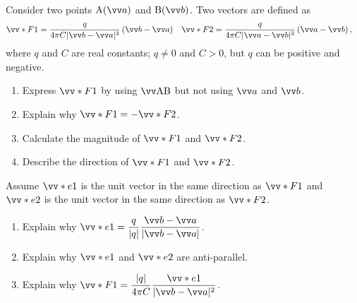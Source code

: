 \documentclass[11pt,pdfa,lastpage]{MishoNote}
\begin{document}
\begin{problems}
  \Problem[S] Consider two points $\posvec Aa$ and $\posvec Bb$. Two vectors are defined as
  \begin{align*}
    & \vc F_1=\frac{q}{4\pi C|\vc b-\vc a|^3}\left(\vc b-\vc a\right)
    &&\vc F_2=\frac{q}{4\pi C|\vc a-\vc b|^3}\left(\vc a-\vc b\right),
  \end{align*}
  where $q$ and $C$ are real constants; $q\neq 0$ and $C>0$, but $q$ can be positive and negative.
  \begin{enumerate}
    \item Express $\vc F_1$ by using $\vvv{AB}$ but not using $\vc a$ and $\vc b$.
    \item Explain why $\vc F_1=-\vc F_2$.
    \item Calculate the magnitude of $\vc F_1$ and $\vc F_2$.
    \item Describe the direction of $\vc F_1$ and $\vc F_2$.\\
  \end{enumerate}
  Assume $\vc e_1$ is the unit vector in the same direction as $\vc F_1$ and $\vc e_2$ is the unit vector in the same direction as $\vc F_2$.
  \begin{enumerate}[resume]
    \item Explain why $\vc e_1=\dfrac{q}{|q|}\dfrac{\vc b-\vc a}{|\vc b-\vc a|}$.
    \item Explain why $\vc e_1$ and $\vc e_2$ are anti-parallel.
    \item Explain why $\vc F_1=\dfrac{|q|}{4\pi C}\dfrac{\vc e_1}{|\vc b-\vc a|^2}$.
  \end{enumerate}
\end{problems}
\end{document}
